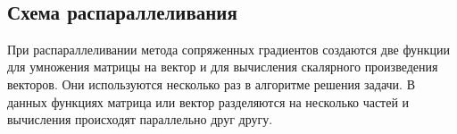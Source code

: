 \documentclass{report}
\begin{document}
\\

\newpage

\begin{center}
\section*{Схема распараллеливания}
\end{center}
При распараллеливании метода сопряженных градиентов создаются две функции для умножения матрицы на вектор и для вычисления скалярного произведения векторов. Они используются несколько раз в алгоритме решения задачи. В данных функциях матрица или вектор разделяются на несколько частей и вычисления происходят параллельно друг другу.
\newpage
\end{document}
